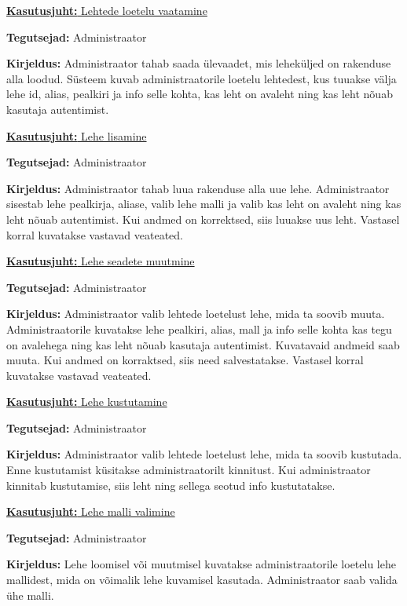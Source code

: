 \documentclass[a4paper,12pt]{article} %
\begin{document}
\underline{\textbf{Kasutusjuht:} Lehtede loetelu vaatamine}
\par
\textbf{Tegutsejad:} Administraator
\par
\textbf{Kirjeldus:} Administraator tahab saada ülevaadet, mis leheküljed on rakenduse alla loodud. Süsteem kuvab administraatorile loetelu lehtedest, kus tuuakse välja lehe id, alias, pealkiri ja info selle kohta, kas leht on avaleht ning kas leht nõuab kasutaja autentimist.
\par

\underline{\textbf{Kasutusjuht:} Lehe lisamine}
\par
\textbf{Tegutsejad:} Administraator
\par
\textbf{Kirjeldus:} Administraator tahab luua rakenduse alla uue lehe. Administraator sisestab lehe pealkirja, aliase, valib lehe malli ja valib kas leht on avaleht ning kas leht nõuab autentimist. Kui andmed on korrektsed, siis luuakse uus leht. Vastasel korral kuvatakse vastavad veateated.
\par

\underline{\textbf{Kasutusjuht:} Lehe seadete muutmine}
\par
\textbf{Tegutsejad:} Administraator
\par
\textbf{Kirjeldus:} Administraator valib lehtede loetelust lehe, mida ta soovib muuta. Administraatorile kuvatakse lehe pealkiri, alias, mall ja info selle kohta kas tegu on avalehega ning kas leht nõuab kasutaja autentimist. Kuvatavaid andmeid saab muuta. Kui andmed on korraktsed, siis need salvestatakse. Vastasel korral kuvatakse vastavad veateated.
\par

\underline{\textbf{Kasutusjuht:} Lehe kustutamine}
\par
\textbf{Tegutsejad:} Administraator
\par
\textbf{Kirjeldus:} Administraator valib lehtede loetelust lehe, mida ta soovib kustutada. Enne kustutamist küsitakse administraatorilt kinnitust. Kui administraator kinnitab kustutamise, siis leht ning sellega seotud info kustutatakse.
\par

\underline{\textbf{Kasutusjuht:} Lehe malli valimine}
\par
\textbf{Tegutsejad:} Administraator
\par
\textbf{Kirjeldus:} Lehe loomisel või muutmisel kuvatakse administraatorile loetelu lehe mallidest, mida on võimalik lehe kuvamisel kasutada. Administraator saab valida ühe malli.
\end{document}
